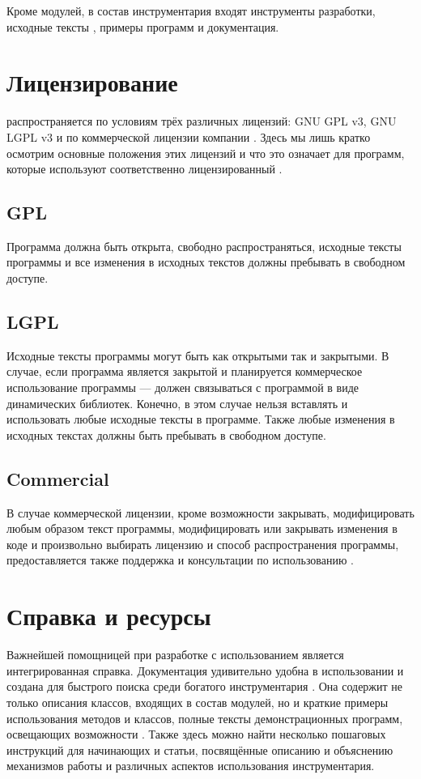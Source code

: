 Кроме модулей, в состав инструментария входят инструменты разработки, исходные тексты , примеры программ
и документация.

\section[Лицензирование \Sys{Qt} ]{Лицензирование }
 распространяется по условиям трёх различных лицензий: GNU GPL v3, GNU LGPL v3 и по коммерческой
лицензии компании . Здесь мы лишь кратко осмотрим основные положения этих лицензий и что это означает для
программ, которые используют соответственно лицензированный .

\subsection[GPL]{GPL}
Программа должна быть открыта, свободно распространяться, исходные тексты программы и все изменения в
исходных текстов  должны пребывать в свободном доступе.

\subsection[LGPL]{LGPL}
Исходные тексты программы могут быть как открытыми так и закрытыми. В случае, если программа является
закрытой и планируется коммерческое использование программы ---  должен связываться с программой в виде
динамических библиотек. Конечно, в этом случае нельзя вставлять и использовать любые
исходные тексты  в программе. Также любые изменения в исходных текстах  должны быть 
пребывать в свободном доступе.

\subsection[Commercial]{Commercial}
В случае коммерческой лицензии, кроме возможности закрывать, модифицировать любым образом текст программы,
модифицировать или закрывать изменения в коде  и произвольно выбирать лицензию и способ распространения программы,
предоставляется также поддержка и консультации по использованию .

\section[Справка и ресурсы]{Справка и ресурсы}
Важнейшей помощницей при разработке с использованием  является интегрированная справка. Документация 
удивительно удобна в использовании и создана для быстрого поиска среди богатого инструментария . Она содержит не
только описания классов, входящих в состав модулей, но и краткие примеры использования методов и классов, полные тексты
демонстрационных программ, освещающих возможности . Также здесь можно найти несколько пошаговых инструкций для
начинающих и статьи, посвящённые описанию и
объяснению механизмов работы и различных аспектов использования инструментария.

